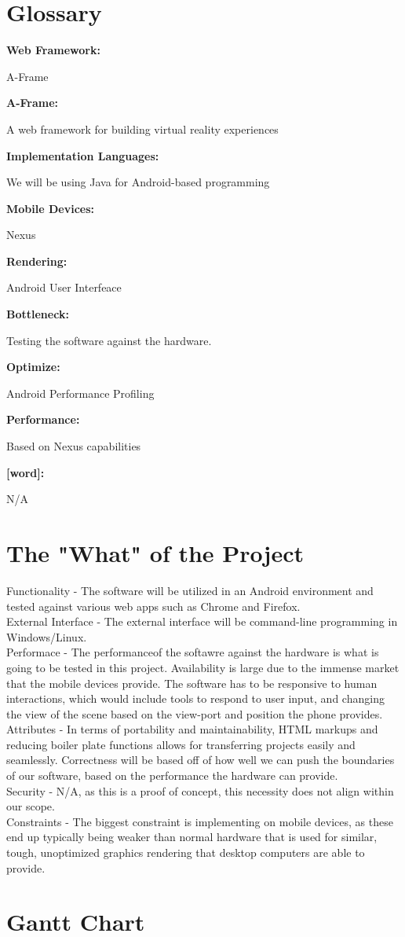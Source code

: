 \documentclass[letterpaper,10pt,titlepage,draftclsnofoot,onecolumn,compsoc,utf8,latin1]{IEEEtran}
\begin{document}
\section{Glossary}
\begin{enumerate}
    {\item \bfseries Web Framework: } A-Frame
    {\item \bfseries A-Frame: } A web framework for building virtual reality experiences
    {\item \bfseries Implementation Languages: } We will be using Java for Android-based programming
    {\item \bfseries Mobile Devices: } Nexus
    {\item \bfseries Rendering: } Android User Interfeace
    {\item \bfseries Bottleneck: } Testing the software against the hardware.
    {\item \bfseries Optimize: } Android Performance Profiling
    {\item \bfseries Performance: } Based on Nexus capabilities
    {\item \bfseries [word]: } N/A
\end{enumerate}

\section{The "What" of the Project}
\begin{singlespace}
Functionality - The software will be utilized in an Android environment and tested against various web apps such as Chrome and Firefox.\\

\noindent
External Interface - The external interface will be command-line programming in Windows/Linux.\\

\noindent
Performace - The performanceof the softawre against the hardware is what is going to be tested in this project.
Availability is large due to the immense market that the mobile devices provide. The software has to be responsive to human interactions, which would include tools to respond to user input, and changing the view of the scene based on the view-port and position the phone provides.\\


\noindent
Attributes - In terms of portability and maintainability, HTML markups and reducing boiler plate functions allows for transferring projects easily and seamlessly.
Correctness will be based off of how well we can push the boundaries of our software, based on the performance the hardware can provide.\\

\noindent
Security - N/A, as this is a proof of concept, this necessity does not align within our scope.\\

\noindent
Constraints - The biggest constraint is implementing on mobile devices, as these end up typically being weaker than normal hardware that is used for similar, tough, unoptimized graphics rendering that desktop computers are able to provide.
\end{singlespace}

\section{Gantt Chart}



    
\end{document}
